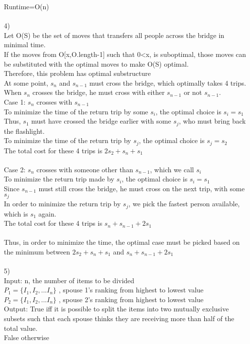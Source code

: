 \documentclass[a4paper,12pt]{article}
\begin{document}
Runtime=O(n)\\\\
4) \\
Let O(S) be the set of moves that transfers all people across the bridge in minimal time. \\
If the moves from O[x,O.length-1] such that 0<x, is suboptimal, those moves can be substituted with the optimal moves to make O(S) optimal. \\
Therefore, this problem has optimal substructure\\
At some point, $s_n$ and $s_{n-1}$ must cross the bridge, which optimally takes 4 trips.  \\
When $s_n$ crosses the bridge, he must cross with either $s_{n-1}$ or not $s_{n-1}$.\\
Case 1: $s_n$ crosses with $s_{n-1}$\\
To minimize the time of the return trip by some $s_i$, the optimal choice is $s_i=s_1$\\
Thus, $s_1$ must have crossed the bridge earlier with some $s_j$, who must bring back the flashlight.\\
To minimize the time of the return trip by $s_j$, the optimal choice is $s_j=s_2$\\
The total cost for these 4 trips is $2s_2+s_n+s_1$\\\\
Case 2: $s_n$ crosses with someone other than $s_{n-1}$, which we call $s_i$\\
To minimize the return trip made by $s_i$, the optimal choice is $s_i=s_1$\\
Since $s_{n-1}$ must still cross the bridge, he must cross on the next trip, with some $s_j$\\
In order to minimize the return trip by $s_j$, we pick the fastest person available, which is $s_1$ again. \\
The total cost for these 4 trips is $s_n+s_{n-1}+2s_1$\\\\

Thus, in order to minimize the time, the optimal case must be picked based on the minimum between $2s_2+s_n+s_1$ and $s_n+s_{n-1}+2s_1$\\\\
5) \\
Input: n, the number of items to be divided \\
$P_1 = \{I_1,I_2,...I_n\} $ , spouse 1's ranking from highest to lowest value\\
$P_2 = \{I_1,I_2,...I_n\} $ , spouse 2's ranking from highest to lowest value\\
Output: True iff it is possible to split the items into two mutually exclusive subsets such that each spouse thinks they are receiving more than half of the total value.\\
False otherwise\\ 
\end{document}
